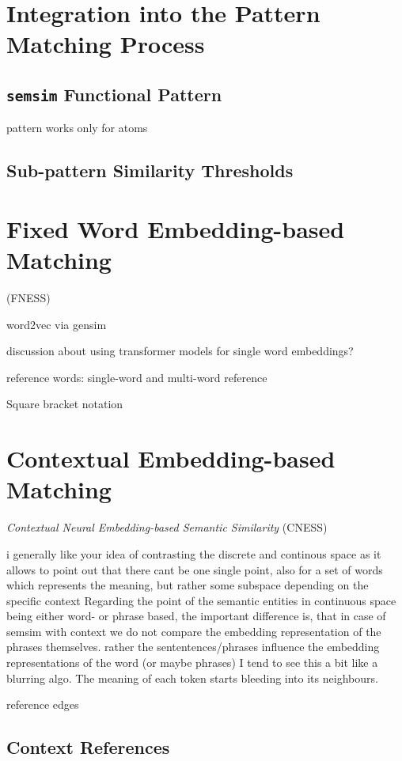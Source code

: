 \documentclass[11pt]{scrreprt}
\begin{document}
\section{Integration into the Pattern Matching Process}
\subsection{\texttt{semsim} Functional Pattern}
pattern works only for atoms

\subsection{Sub-pattern Similarity Thresholds}


\section{Fixed Word Embedding-based Matching}
(FNESS)
 
word2vec via gensim

discussion about using transformer models for single word embeddings?


reference words: single-word and multi-word reference

\label{sec:semsim-multi-word}
Square bracket notation 

\section{Contextual Embedding-based Matching}
\textit{Contextual Neural Embedding-based Semantic Similarity} 
(CNESS)


i generally like your idea of contrasting the discrete and continous space as it allows to point out that there cant be one single point, also for a set of words which represents the meaning, but rather some subspace depending on the specific context
Regarding the point of the semantic entities in continuous space being either word- or phrase based, the important difference is, that in case of semsim with context we do not compare the embedding representation of the phrases themselves. rather the sententences/phrases influence the embedding representations of the word (or maybe phrases)
 I tend to see this a bit like a blurring algo. The meaning of each token starts bleeding into its neighbours.


reference edges

\subsection{Context References}
\end{document}
